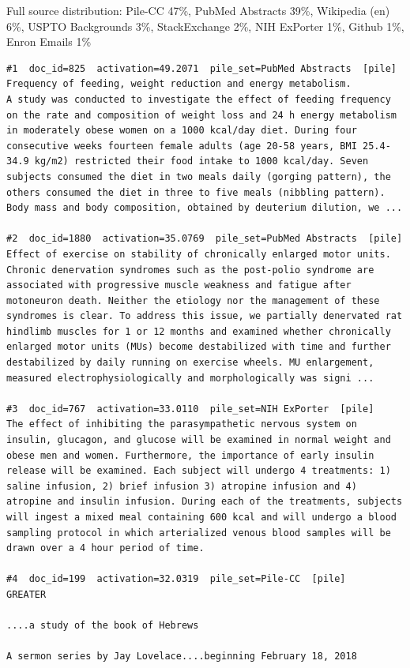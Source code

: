 Full source distribution: Pile-CC 47\%, PubMed Abstracts 39\%, Wikipedia (en) 6\%, USPTO Backgrounds 3\%, StackExchange 2\%, NIH ExPorter 1\%, Github 1\%, Enron Emails 1\%

\begin{verbatim}
#1  doc_id=825  activation=49.2071  pile_set=PubMed Abstracts  [pile]
Frequency of feeding, weight reduction and energy metabolism.
A study was conducted to investigate the effect of feeding frequency on the rate and composition of weight loss and 24 h energy metabolism in moderately obese women on a 1000 kcal/day diet. During four consecutive weeks fourteen female adults (age 20-58 years, BMI 25.4-34.9 kg/m2) restricted their food intake to 1000 kcal/day. Seven subjects consumed the diet in two meals daily (gorging pattern), the others consumed the diet in three to five meals (nibbling pattern). Body mass and body composition, obtained by deuterium dilution, we ...

#2  doc_id=1880  activation=35.0769  pile_set=PubMed Abstracts  [pile]
Effect of exercise on stability of chronically enlarged motor units.
Chronic denervation syndromes such as the post-polio syndrome are associated with progressive muscle weakness and fatigue after motoneuron death. Neither the etiology nor the management of these syndromes is clear. To address this issue, we partially denervated rat hindlimb muscles for 1 or 12 months and examined whether chronically enlarged motor units (MUs) become destabilized with time and further destabilized by daily running on exercise wheels. MU enlargement, measured electrophysiologically and morphologically was signi ...

#3  doc_id=767  activation=33.0110  pile_set=NIH ExPorter  [pile]
The effect of inhibiting the parasympathetic nervous system on insulin, glucagon, and glucose will be examined in normal weight and obese men and women. Furthermore, the importance of early insulin release will be examined. Each subject will undergo 4 treatments: 1) saline infusion, 2) brief infusion 3) atropine infusion and 4) atropine and insulin infusion. During each of the treatments, subjects will ingest a mixed meal containing 600 kcal and will undergo a blood sampling protocol in which arterialized venous blood samples will be drawn over a 4 hour period of time.

#4  doc_id=199  activation=32.0319  pile_set=Pile-CC  [pile]
GREATER

....a study of the book of Hebrews

A sermon series by Jay Lovelace....beginning February 18, 2018


\end{verbatim}
